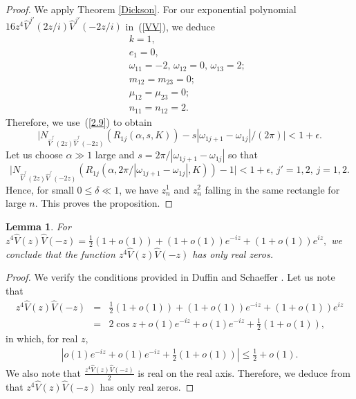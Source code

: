 \documentclass[10pt,a4paper]{article}
\theoremstyle{plain}
\newtheorem{lemma}[theorem]{Lemma}
\theoremstyle{definition}
\theoremstyle{remark}
\numberwithin{equation}{section}
\begin{document}
\begin{proof}
We apply Theorem \ref{Dickson}. For our exponential polynomial 
$16z^{4}\hat{V}^{j'}(2z/i)\hat{V}^{j'}(-2z/i)$ in~(\ref{VV}), we deduce
\begin{eqnarray*}
&&k=1,\\
&&e_{1}=0,\\
&&\omega_{11}=-2,\,\omega_{12}=0,\,\omega_{13}=2;\\
&&m_{12}=m_{23}=0;\\
&&\mu_{12}=\mu_{23}=0;\\
&&n_{11}=n_{12}=2.
\end{eqnarray*}
Therefore, we use~(\ref{2.9}) to obtain
\begin{equation}\nonumber
\big|N_{\hat{V}^{^{j'}}(2z)\hat{V}^{^{j'}}(-2z)}(R_{1j}(\alpha,s,K))-s|\omega_{1j+1}-\omega_{1j}|/(2\pi)\big|<1+\epsilon.
\end{equation} 
Let us choose $\alpha\gg1$ large and $s=2\pi/|\omega_{1j+1}-\omega_{1j}|$ so that
\begin{equation}\label{2.11}
\big|N_{\hat{V}^{^{j'}}(2z)\hat{V}^{^{j'}}(-2z)}(R_{1j}(\alpha,2\pi/|\omega_{1j+1}-\omega_{1j}|,K))-1\big|<1+\epsilon,\,j'=1,2,\,j=1,2.
\end{equation} 
Hence, for small $0\leq\delta\ll1$, we have $z^{1}_{n}$ and $z^{2}_{n}$ falling in the same rectangle for large $n$.
This proves the proposition.
\end{proof}
\begin{lemma}\label{L29}
For $z^{4}\hat{V}(z)\hat{V}(-z)=\frac{1}{2}(1+o(1))+(1+o(1))e^{-iz}+(1+o(1))e^{iz},$ we conclude that the function $z^{4}\hat{V}(z)\hat{V}(-z)$ has only real zeros.
\end{lemma}
\begin{proof}
We verify the conditions provided in Duffin and Schaeffer \cite[p.\,236]{Duffin}.
Let us note that 
\begin{eqnarray*}
z^{4}\hat{V}(z)\hat{V}(-z)&=&\frac{1}{2}(1+o(1))+(1+o(1))e^{-iz}+(1+o(1))e^{iz}\\&=&2\cos z+o(1)e^{-iz}+o(1)e^{-iz}+\frac{1}{2}(1+o(1)),
\end{eqnarray*}
in which, for real $z$,
\begin{eqnarray*}
|o(1)e^{-iz}+o(1)e^{-iz}+\frac{1}{2}(1+o(1))|\leq \frac{1}{2}+o(1).
\end{eqnarray*}
We also note that $\frac{z^{4}\hat{V}(z)\hat{V}(-z)}{2}$ is real on the real axis. Therefore, we deduce from \cite{Duffin} that $z^{4}\hat{V}(z)\hat{V}(-z)$ has only real zeros.
\end{proof}
\end{document}
